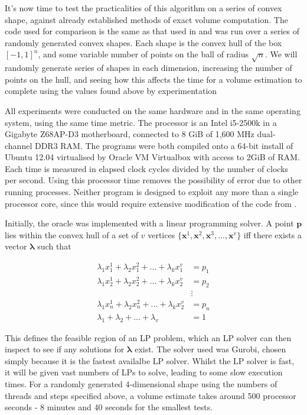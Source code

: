 It's now time to test the practicalities of this algorithm on a series of convex shape, against already established methods of exact volume computation. The code used for comparison is the same as that used in %
and was run over a series of randomly generated convex shapes. Each shape is the convex hull of the box $[-1,1]^n$, and some variable number of points on the ball of radius $\sqrt n$. We will randomly generate series of shapes in each dimension, increasing the number of points on the hull, and seeing how this affects the time for a volume estimation to complete using the values found above by experimentation

All experiments were conducted on the same hardware and in the same operating system, using the same time metric. The processor is an Intel i5-2500k in a Gigabyte Z68AP-D3 motherboard, connected to 8 GiB of 1,600 MHz dual-channel DDR3 RAM. The programs were both compiled onto a 64-bit install of Ubuntu 12.04 virtualised by Oracle VM Virtualbox with access to 2GiB of RAM. Each time is measured in elapsed clock cycles divided by the number of clocks per second. Using this processor time removes the possibility of error due to other running processes. Neither program is designed to exploit any more than a single processor core, since this would require extensive modification of the code from %
.

Initially, the oracle was implemented with a linear programming solver. A point ${\bm p}$ lies within the convex hull of a set of $v$ vertices $\{{\bm x}^1, {\bm x}^2, {\bm x}^3, ..., {\bm x}^v\}$ iff there exists a vector ${\bm \lambda}$ such that

\begin{align*}
\lambda_1 x^1_1 + \lambda_2 x^2_1 + ... + \lambda_k x^v_1 &= p_1 \\
\lambda_1 x^1_2 + \lambda_2 x^2_2 + ... + \lambda_k x^v_2 &= p_2 \\
&\vdots \\
\lambda_1 x^1_n + \lambda_2 x^2_n + ... + \lambda_k x^v_2 &= p_n \\
\lambda_1 + \lambda_2 + ... + \lambda_v &= 1
\end{align*}

This defines the feasible region of an LP problem, which an LP solver can then inspect to see if any solutions for ${\bm \lambda}$ exist. The solver used was Gurobi, chosen simply because it is the fastest availalbe LP solver. Whilst the LP solver is fast, it will be given vast numbers of LPs to solve, leading to some slow execution times. For a randomly generated 4-dimensional shape using the numbers of threads and steps specified above, a volume estimate takes around 500 processor seconds - 8 minutes and 40 seconds for the smallest tests. 

